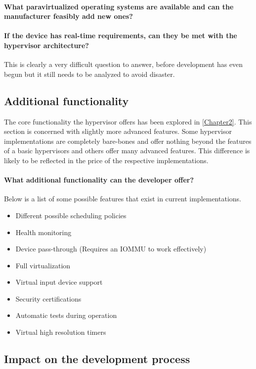 \paragraph{What paravirtualized operating systems are available and can the manufacturer feasibly add new ones?}

\paragraph{If the device has real-time requirements, can they be met with the hypervisor architecture?}
This is clearly a very difficult question to answer, before development has even begun but it still needs to be analyzed to avoid disaster.
\subsection{Additional functionality}
The core functionality the hypervisor offers has been explored in \ref{Chapter2}. This section is concerned with slightly more advanced features. Some hypervisor implementations are completely bare-bones and offer nothing beyond the features of a basic hypervisors and others offer many advanced features. This difference is likely to be reflected in the price of the respective implementations.
\paragraph{What additional functionality can the developer offer?}
Below is a list of some possible features that exist in current implementations.
\begin{itemize}
    \item Different possible scheduling policies
    \item Health monitoring
    \item Device pass-through (Requires an \gls{IOMMU} to work effectively)
    \item Full virtualization
    \item Virtual input device support
    \item Security certifications
    \item Automatic tests during operation
    \item Virtual high resolution timers
\end{itemize}

\subsection{Impact on the development process}
